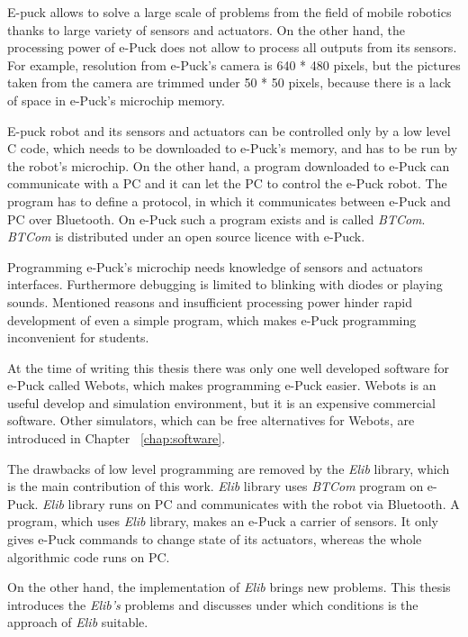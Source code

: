 	E-puck allows to solve a large scale of problems from the field of mobile robotics thanks to 
	large variety of sensors and actuators. On the other hand, the processing power of e-Puck does not allow to 
	process all outputs from its sensors. For example, resolution from e-Puck's camera is 640 * 480 pixels,
	but the pictures taken from the camera are trimmed under 50 * 50 pixels, because there is a lack of space in 
	 e-Puck's microchip memory.
	 
	 E-puck robot and its sensors and actuators can be controlled only by a low level C code,
	  which needs to be downloaded to e-Puck's memory, and has to be run by the robot's microchip.
	 On the other hand, a program downloaded to e-Puck can communicate with
	 a PC and it can let the PC to control the e-Puck robot. 
	 The program has to define a protocol, in which it communicates between e-Puck and PC over Bluetooth.
	On e-Puck such a program exists and is called {\it BTCom}. 
	{\it BTCom} is distributed under an open source licence with e-Puck.

	Programming e-Puck's microchip needs knowledge of sensors and actuators interfaces.
	Furthermore debugging is limited to blinking with diodes or playing sounds.
	Mentioned reasons and insufficient processing power hinder rapid development of even a simple program, 
	which makes e-Puck programming inconvenient for students.
	
	At the time of writing this thesis there was only one well developed software for e-Puck called Webots,
	which makes programming e-Puck easier.
	Webots is an useful develop and simulation environment, but it is an expensive commercial software.
	Other simulators, which can be free alternatives for Webots, are introduced in Chapter ~\ref{chap:software}.
	
	The drawbacks of low level programming are removed by the {\it Elib} library, which is the main 
	contribution of this work.
        {\it Elib} library uses {\it BTCom} program on e-Puck.
	{\it Elib} library runs on PC and communicates with the robot via Bluetooth. 
	A program, which uses {\it Elib} library,	makes an e-Puck a carrier of sensors. It only gives e-Puck 	
	commands to change state of its actuators, whereas the whole algorithmic code runs on PC.
	
	On the other hand, the implementation of {\it Elib} brings new problems.
	This thesis introduces the {\it Elib's} problems and discusses 
	under which conditions is the approach of {\it Elib} suitable.	
